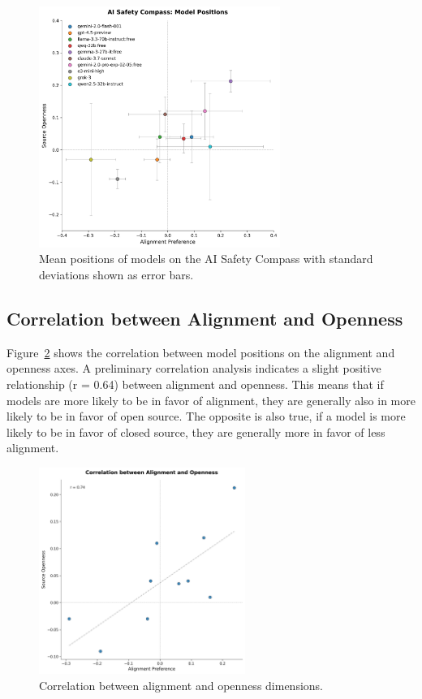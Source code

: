 \begin{figure}[htbp]
    \centering
    \includegraphics[width=0.7\textwidth]{figures/compass_with_error_bars.png}
    \caption{Mean positions of models on the AI Safety Compass with standard deviations shown as error bars.}
    \label{fig:compass_variance}
\end{figure}

\subsection{Correlation between Alignment and Openness}

Figure~\ref{fig:correlation} shows the correlation between model positions on the alignment and openness axes. A preliminary correlation analysis indicates a slight positive relationship (r = 0.64) between alignment and openness. This means that if models are more likely to be in favor of alignment, they are generally also in more likely to be in favor of open source. The opposite is also true, if a model is more likely to be in favor of closed source, they are generally more in favor of less alignment.

\begin{figure}[htbp]
    \centering
    \includegraphics[width=0.6\textwidth]{figures/alignment_openness_correlation.png}
    \caption{Correlation between alignment and openness dimensions.}
    \label{fig:correlation}
\end{figure}

